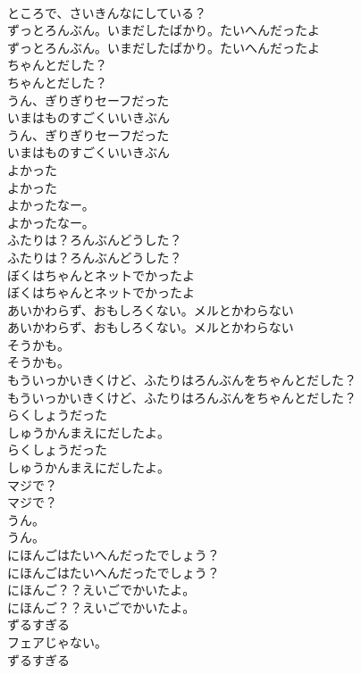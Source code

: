 \documentclass[8pt]{extreport}
\begin{document}
\begin{CJK}{UTF8}{min}
\\	ところで、さいきんなにしている？
\\	ずっとろんぶん。いまだしたばかり。たいへんだったよ
\\	ずっとろんぶん。いまだしたばかり。たいへんだったよ
\\	ちゃんとだした？
\\	ちゃんとだした？
\\	うん、ぎりぎりセーフだった
\\	いまはものすごくいいきぶん
\\	うん、ぎりぎりセーフだった
\\	いまはものすごくいいきぶん
\\	よかった
\\	よかった
\\	よかったなー。
\\	よかったなー。
\\	ふたりは？ろんぶんどうした？
\\	ふたりは？ろんぶんどうした？
\\	ぼくはちゃんとネットでかったよ
\\	ぼくはちゃんとネットでかったよ
\\	あいかわらず、おもしろくない。メルとかわらない
\\	あいかわらず、おもしろくない。メルとかわらない
\\	そうかも。
\\	そうかも。
\\	もういっかいきくけど、ふたりはろんぶんをちゃんとだした？
\\	もういっかいきくけど、ふたりはろんぶんをちゃんとだした？
\\	らくしょうだった
\\	しゅうかんまえにだしたよ。
\\	らくしょうだった
\\	しゅうかんまえにだしたよ。
\\	マジで？
\\	マジで？
\\	うん。
\\	うん。
\\	にほんごはたいへんだったでしょう？
\\	にほんごはたいへんだったでしょう？
\\	にほんご？？えいごでかいたよ。
\\	にほんご？？えいごでかいたよ。
\\	ずるすぎる
\\	フェアじゃない。
\\	ずるすぎる

\end{CJK}
\end{document}
